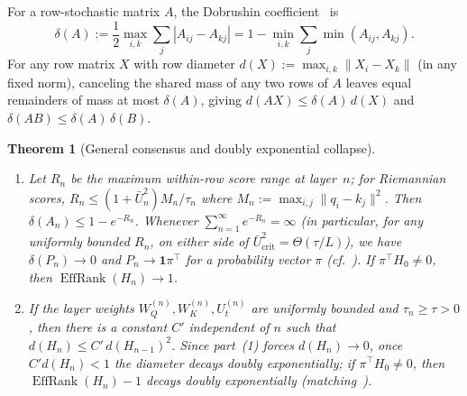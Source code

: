 \documentclass[11pt]{article}
\theoremstyle{plain}
\newtheorem{theorem}{Theorem}
\theoremstyle{definition}
\theoremstyle{remark}
\DeclareMathOperator{\EffRank}{EffRank}
\begin{document}
For a row-stochastic matrix $A$, the Dobrushin coefficient~\cite{dobrushin1956clt} is
\[
\delta(A) := \frac{1}{2}\max_{i,k}\sum_j |A_{ij} - A_{kj}| = 1 - \min_{i,k}\sum_j \min(A_{ij}, A_{kj}).
\]
For any row matrix $X$ with row diameter $d(X) := \max_{i,k}\|X_i - X_k\|$ (in any fixed norm), canceling the shared mass of any two rows of $A$ leaves equal remainders of mass at most $\delta(A)$, giving $d(AX) \le \delta(A)\,d(X)$ and $\delta(AB) \le \delta(A)\,\delta(B)$.

\begin{theorem}[General consensus and doubly exponential collapse]\label{thm:dobrushin}
\leavevmode
\begin{enumerate}[label=\textup{(\arabic*)}]
\item Let $R_n$ be the maximum within-row score range at layer~$n$; for Riemannian scores, $R_n \le (1 + \bar U_n^2)M_n/\tau_n$ where $M_n := \max_{i,j}\|q_i - k_j\|^2$. Then $\delta(A_n) \le 1 - e^{-R_n}$. Whenever $\sum_{n=1}^\infty e^{-R_n} = \infty$ (in particular, for any uniformly bounded $R_n$, on either side of $\bar U_{\mathrm{crit}}^2 = \Theta(\tau/L)$), we have $\delta(P_n) \to 0$ and $P_n \to \mathbf{1}\pi^\top$ for a probability vector $\pi$ (cf.~\cite{wolfowitz1963products,leizarowitz1992infinite}). If $\pi^\top H_0 \neq 0$, then $\EffRank(H_n) \to 1$.
\item If the layer weights $W_Q^{(n)}, W_K^{(n)}, U_t^{(n)}$ are uniformly bounded and $\tau_n \ge \tau > 0$, then there is a constant $C'$ independent of $n$ such that $d(H_n) \le C'\,d(H_{n-1})^2$. Since part~(1) forces $d(H_n) \to 0$, once $C' d(H_n) < 1$ the diameter decays doubly exponentially; if $\pi^\top H_0 \neq 0$, then $\EffRank(H_n) - 1$ decays doubly exponentially (matching~\cite{dong2021attention}).
\end{enumerate}
\end{theorem}
\end{document}
